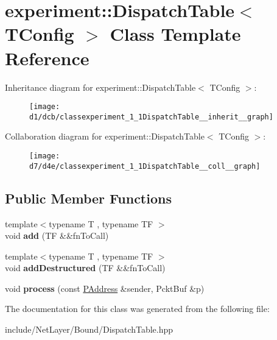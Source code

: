 \hypertarget{classexperiment_1_1DispatchTable}{}\section{experiment\+:\+:Dispatch\+Table$<$ T\+Config $>$ Class Template Reference}
\label{classexperiment_1_1DispatchTable}


Inheritance diagram for experiment\+:\+:Dispatch\+Table$<$ T\+Config $>$\+:\nopagebreak
\begin{figure}[H]
\begin{center}
\leavevmode
\texttt{[image: d1/dcb/classexperiment\_1\_1DispatchTable\_\_inherit\_\_graph]}
\end{center}
\end{figure}


Collaboration diagram for experiment\+:\+:Dispatch\+Table$<$ T\+Config $>$\+:\nopagebreak
\begin{figure}[H]
\begin{center}
\leavevmode
\texttt{[image: d7/d4e/classexperiment\_1\_1DispatchTable\_\_coll\_\_graph]}
\end{center}
\end{figure}
\subsection*{Public Member Functions}
\begin{DoxyCompactItemize}
\item 
\hypertarget{classexperiment_1_1DispatchTable_a84002d58d9223f5677be1212eb947005}{}{\footnotesize template$<$typename T , typename T\+F $>$ }\\void {\bfseries add} (T\+F \&\&fn\+To\+Call)\label{classexperiment_1_1DispatchTable_a84002d58d9223f5677be1212eb947005}

\item 
\hypertarget{classexperiment_1_1DispatchTable_a31966af1468a06b7b669fdff141cb2d6}{}{\footnotesize template$<$typename T , typename T\+F $>$ }\\void {\bfseries add\+Destructured} (T\+F \&\&fn\+To\+Call)\label{classexperiment_1_1DispatchTable_a31966af1468a06b7b669fdff141cb2d6}

\item 
\hypertarget{classexperiment_1_1DispatchTable_a28107f8398ff02447afd291180b38331}{}void {\bfseries process} (const \hyperlink{structnl_1_1PAddress}{P\+Address} \&sender, Pckt\+Buf \&p)\label{classexperiment_1_1DispatchTable_a28107f8398ff02447afd291180b38331}

\end{DoxyCompactItemize}


The documentation for this class was generated from the following file\+:\begin{DoxyCompactItemize}
\item 
include/\+Net\+Layer/\+Bound/Dispatch\+Table.\+hpp\end{DoxyCompactItemize}
